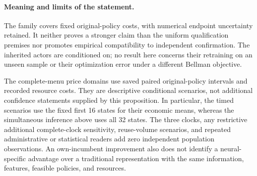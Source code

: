 \paragraph{Meaning and limits of the statement.}
The family covers fixed original-policy costs, with numerical endpoint
uncertainty retained. It neither proves a stronger claim than the
uniform qualification premises nor promotes empirical compatibility
to independent confirmation. The inherited actors are conditioned on;
no result here concerns their retraining on an unseen sample or their
optimization error under a different Bellman objective.

The complete-menu price domains use saved paired original-policy
intervals and recorded resource costs. They are descriptive conditional
scenarios, not additional confidence statements supplied by this
proposition. In particular, the timed scenarios use the fixed first
16 states for their economic means, whereas the simultaneous inference
above uses all 32 states. The three clocks, any restrictive additional
complete-clock sensitivity, reuse-volume scenarios, and repeated
administrative or statistical readers add zero independent population
observations. An own-incumbent improvement also does not identify a
neural-specific advantage over a traditional representation with the
same information, features, feasible policies, and resources.
